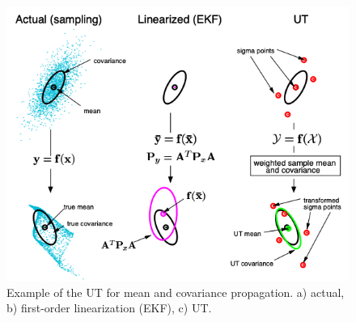 \begin{figure}
\centering
\includegraphics[width=\linewidth]{./img/gp/ut.png}
\caption{Example of the UT for mean and covariance propagation. a) actual, b) first-order linearization (EKF), c) UT.}
\label{fig:ufk-ut}
\end{figure}